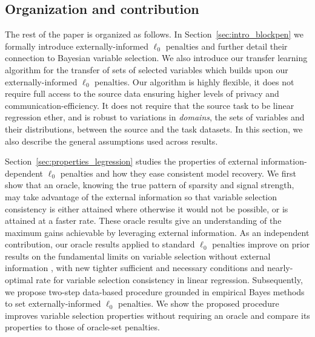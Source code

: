 \documentclass[
  12pt]{article}
\begin{document}
\subsection{Organization and contribution}
The rest of the paper is organized as follows. In Section~\ref{sec:intro_blockpen} we formally introduce externally-informed $\ell_0$ penalties and further detail their connection to Bayesian variable selection. We also introduce our transfer learning algorithm for the transfer of sets of selected variables which builds upon our externally-informed $\ell_0$ penalties. Our algorithm is highly flexible, it does not require full access to the source data ensuring higher levels of privacy and communication-efficiency. It does not require that the source task to be linear regression ether, and is robust to variations in \textit{domains}, the sets of variables and their distributions, between the source and the task datasets. In this section, we also describe the general assumptions used across results.

Section~\ref{sec:properties_legression} studies the properties of external information-dependent $\ell_0$ penalties and how they ease consistent model recovery. We first show that an oracle, knowing the true pattern of sparsity and signal strength, may take advantage of the external information so that variable selection consistency is either attained where otherwise it would not be possible, or is attained at a faster rate. These oracle results give an understanding of the maximum gains achievable by leveraging external information. As an independent contribution, our oracle results applied to standard $\ell_0$ penalties improve on prior results on the fundamental limits on variable selection without external information \cite{infotheowainwright, wang2010, bryon, butucea2018}, with new tighter sufficient and necessary conditions and nearly-optimal rate for variable selection consistency in linear regression. Subsequently, we propose two-step data-based procedure grounded in empirical Bayes methods to set externally-informed $\ell_0$ penalties. We show the proposed procedure improves variable selection properties without requiring an oracle and compare its properties to those of oracle-set penalties. 
\end{document}
